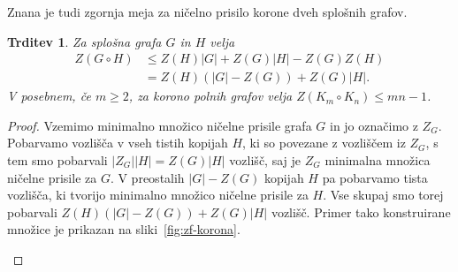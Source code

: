\documentclass[12pt,a4paper,twoside]{article}
\theoremstyle{definition} %
\theoremstyle{plain} %
\newtheorem{trditev}[definicija]{Trditev}
\numberwithin{equation}{section}  %
\begin{document}

Znana je tudi zgornja meja za ničelno prisilo korone dveh splošnih grafov.
\begin{trditev}
    Za splošna grafa $G$ in $H$ velja
    \begin{align*}
        Z(G \circ H) &\leq Z(H) |G|+ Z(G) |H| - Z(G) Z(H) \\
        &= Z(H) (|G| - Z(G)) + Z(G) |H|.
    \end{align*} 
    V posebnem, če $m \geq 2$, za korono polnih grafov velja $Z(K_m \circ K_n) \leq mn - 1$. 
\end{trditev}
\begin{proof}
    Vzemimo minimalno množico ničelne prisile grafa $G$ in jo označimo z $Z_G$. Pobarvamo vozlišča v vseh tistih kopijah $H$, ki so povezane z vozliščem iz $Z_G$, s tem smo pobarvali $|Z_G| |H| = Z(G) |H|$ vozlišč, saj je $Z_G$ minimalna množica ničelne prisile za $G$. V preostalih $|G| - Z(G)$ kopijah $H$ pa pobarvamo tista vozlišča, ki tvorijo minimalno množico ničelne prisile za $H$. Vse skupaj smo torej pobarvali $Z(H)(|G| - Z(G)) + Z(G) |H|$ vozlišč. Primer tako konstruirane množice je prikazan na sliki~\ref{fig:zf-korona}.
    \begin{figure}[h]
        \centering
\end{figure}
\end{proof}
\end{document}
